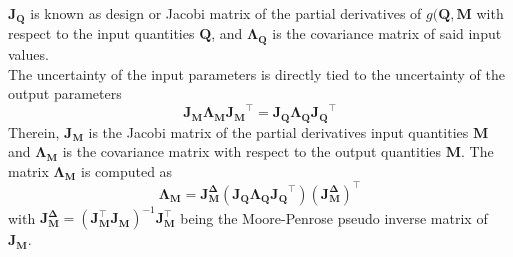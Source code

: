 \documentclass[5p,times,procedia]{elsarticle}
\begin{document}
$\mathbf{J_{Q}}$ is known as design or Jacobi matrix of the partial derivatives of $g(\mathbf{Q},\mathbf{M}$ with respect to the input quantities $\mathbf{Q}$, and $\mathbf{\Lambda_Q}$ is the covariance matrix of said input values. \\
The uncertainty of the input parameters is directly tied to the uncertainty of the output parameters
\begin{equation}
	\mathbf{J_{M}}\mathbf{\Lambda_{M}}\mathbf{J_{M}}^{\top} = \mathbf{J_{Q}}\mathbf{\Lambda_{Q}}\mathbf{J_{Q}}^{\top}
\end{equation}
Therein, $\mathbf{J_{M}}$ is the Jacobi matrix of the partial derivatives input quantities $\mathbf{M}$ and $\mathbf{\Lambda_{M}}$ is the covariance matrix with respect to the output quantities $\mathbf{M}$.
The matrix $\mathbf{\Lambda_{M}}$ is computed as
\begin{equation}
	\mathbf{\Lambda_{M}} = \mathbf{J_{M}^{\Delta}} \left( \mathbf{J_{Q}}\mathbf{\Lambda_{Q}}\mathbf{J_{Q}}^{\top}\right) \left(\mathbf{J_{M}^{\Delta}}\right)^{\top}
\end{equation}
with $ \mathbf{J_{M}^{\Delta}} = \left( \mathbf{J_{M}^{\top}} \mathbf{J_{M}^{}} \right)^{-1}\mathbf{J_{M}^{\top}}$ being the Moore-Penrose pseudo inverse matrix of $\mathbf{J_M}$.
%
\end{document}
